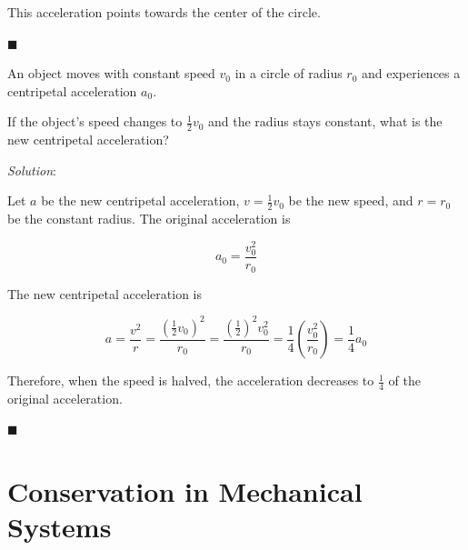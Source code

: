 \documentclass[dvipsnames]{article}
\begin{document}
This acceleration points towards the center of the circle.

\hfill $\blacksquare$

\begin{example}
An object moves with constant speed $v_0$ in a circle of radius $r_0$ and experiences a centripetal acceleration $a_0$. 

\begin{center}
\end{center}

If the object's speed changes to $\frac{1}{2}v_0$ and the radius stays constant, what is the new centripetal acceleration?
\end{example}

\textit{Solution}:

Let $a$ be the new centripetal acceleration, $v = \frac{1}{2}v_0$ be the new speed, and $r = r_0$ be the constant radius. The original acceleration is

\begin{equation*}
    a_0 = \frac{v_0^2}{r_0}
\end{equation*}


The new centripetal acceleration is

\begin{equation*}
    a = \frac{v^2}{r} = \frac{\left(\frac{1}{2}v_0\right)^2}{r_0} = \frac{\left(\frac{1}{2}\right)^2v_0^2}{r_0} = \frac{1}{4} \left(\frac{v_0^2}{r_0}\right) = \frac{1}{4} a_0
\end{equation*}

Therefore, when the speed is halved, the acceleration decreases to $\frac{1}{4}$ of the original acceleration.

\hfill $\blacksquare$


\fi

\clearpage

\section{Conservation in Mechanical Systems}
\end{document}

